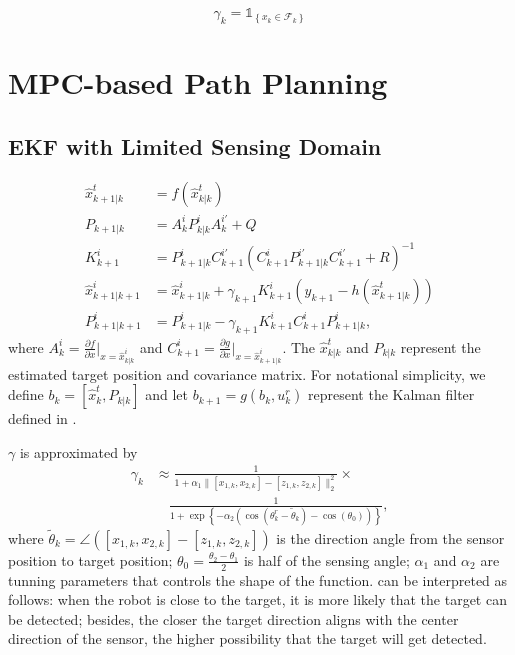 \documentclass[letterpaper, 10 pt, conference]{ieeeconf}  %
\begin{document}
\begin{equation}
\label{eqn:gamma_indicator}
\gamma_{k}=\mathds{1}_{\left\lbrace x_{k}\in\mathcal{F}_{k}\right\rbrace}
\end{equation}

\section{MPC-based Path Planning}\label{sec:method}
\subsection{EKF with Limited Sensing Domain}\label{subseq:KF with FOV}
\begin{subequations}\label{eqn:KF}
	\begin{align}
	\hat{x}^t_{k+1|k}&=f(\hat{x}^t_{k|k})\\
	P_{k+1|k}&=A^i_kP^i_{k|k}A^{i'}_k+Q\\
	K^i_{k+1}&=P^i_{k+1|k}C^{i'}_{k+1}(C^i_{k+1}P^{i'}_{k+1|k}C^{i'}_{k+1}+R)^{-1}\\
	\hat{x}^i_{k+1|k+1}&=\hat{x}^i_{k+1|k}+\gamma_{k+1}K^i_{k+1}(y_{k+1}-h(\hat{x}^t_{k+1|k}))\label{eqn:KF_upd_x}\\
	P^i_{k+1|k+1}&=P^i_{k+1|k}-\gamma_{k+1}K^i_{k+1}C^i_{k+1}P^i_{k+1|k},
	\end{align}
\end{subequations}
where $A^i_k=\frac{\partial f}{\partial x}|_{x=\hat{x}^i_{k|k}}$ and $C^i_{k+1}=\frac{\partial g}{\partial x}|_{x=\hat{x}^i_{k+1|k}}$. 
The $\hat{x}^t_{k|k}$ and $P_{k|k}$ represent the estimated target position and covariance matrix.
For notational simplicity, we define $b_k=[\hat{x}^t_k,P_{k|k}]$ and let $b_{k+1}=g(b_k,u^r_k)$ represent the Kalman filter defined in .

$\gamma$ is approximated by
\begin{equation}\label{eqn:gamma}
\begin{split}
\gamma_{k}&\approx \frac{1}{1+\alpha_1\|[x_{1,k},x_{2,k}]-[z_{1,k},z_{2,k}]\|_2^2}\times\\
&\quad\frac{1}{1+\exp{\left\lbrace-\alpha_2(\cos(\theta^r_k-\tilde{\theta}_k)-\cos(\theta_0))\right\rbrace}},
\end{split}
\end{equation}
where $\tilde{\theta}_k=\angle([x_{1,k},x_{2,k}]-[z_{1,k},z_{2,k}])$ is the direction angle from the sensor position to target position; $\theta_0=\frac{\theta_2-\theta_1}{2}$ is half of the sensing angle; $\alpha_1$ and $\alpha_2$ are tunning parameters that controls the shape of the function. 
 can be interpreted as follows:
when the robot is close to the target, it is more likely that the target can be detected; besides, the closer the target direction aligns with the center direction of the sensor, the higher possibility that the target will get detected.
\end{document}
